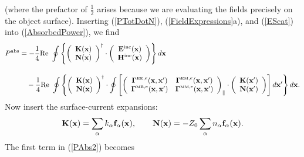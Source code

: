 \documentclass[letterpaper]{article}
\begin{document}
(where the prefactor of $\frac{1}{2}$ arises because we are evaluating
the fields precisely on the object surface). Inserting (\ref{PTotDotN}),
(\ref{FieldExpressions}a), and (\ref{EScat}) into (\ref{AbsorbedPower}), 
we find
\begin{align}
 P^{\hbox{\scriptsize{abs}}}
&=-\frac{1}{4}\text{Re }\oint \left\{
 \left(\begin{array}{c} 
       \mathbf{K}(\mathbf{x})  \\ \mathbf{N}(\mathbf{x}) 
       \end{array}
 \right)^\dagger
 \cdot 
 \left(\begin{array}{c} 
       \mathbf{E}^{\hbox{\scriptsize{inc}}}(\mathbf{x})  \\ \mathbf{H}^{\hbox{\scriptsize{inc}}}(\mathbf{x}) 
       \end{array}
 \right)\right\}d\mathbf{x}
\label{PAbs2}
\\[10pt]
&\quad -\frac{1}{4}\text{Re }\oint \left\{
 \left( \begin{array}{c} 
        \mathbf{K}(\mathbf{x})  \\ \mathbf{N}(\mathbf{x}) 
        \end{array}
 \right)^\dagger
 \cdot 
 \oint\left[
 \left(\begin{array}{cc} 
        \boldsymbol{\Gamma}^{\hbox{\tiny{EE}\scriptsize{,$e$}}}(\mathbf{x}, \mathbf{x}^\prime) &
        \boldsymbol{\Gamma}^{\hbox{\tiny{EM}\scriptsize{,$e$}}}(\mathbf{x}, \mathbf{x}^\prime) \\
        \boldsymbol{\Gamma}^{\hbox{\tiny{ME}\scriptsize{,$e$}}}(\mathbf{x}, \mathbf{x}^\prime) &
        \boldsymbol{\Gamma}^{\hbox{\tiny{MM}\scriptsize{,$e$}}}(\mathbf{x}, \mathbf{x}^\prime)
 \end{array}\right)_{\parallel}
 \cdot
 \left( \begin{array}{c} 
        \mathbf{K}(\mathbf{x}^\prime)  \\ \mathbf{N}(\mathbf{x}^\prime) 
        \end{array}
 \right)\right]d\mathbf{x}^\prime
 \right\}d\mathbf{x}.
\nonumber
\end{align}
Now insert the surface-current expansions:
$$\mathbf{K}(\mathbf{x})=\sum_\alpha k_\alpha \mathbf{f}_\alpha(\mathbf{x}), \qquad
 \mathbf{N}(\mathbf{x})=-Z_0\sum_\alpha n_\alpha \mathbf{f}_\alpha(\mathbf{x}).
$$
The first term in (\ref{PAbs2}) becomes
\end{document}
